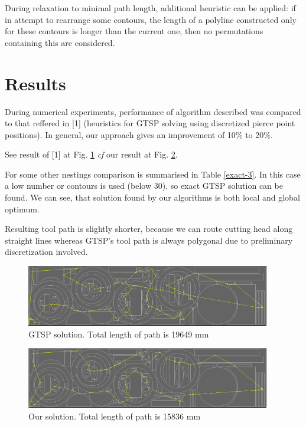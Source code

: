 \documentclass{../download/tPRS2e}
\begin{document}
During relaxation to minimal path length,
additional heuristic can be applied:
if in attempt to rearrange some contours,
the length of a polyline constructed
only for these contours is longer than the current one,
then no permutations containing this are considered.

\section{Results}

During numerical experiments,
performance of algorithm described
was compared to that reffered in [1]
(heuristics for GTSP solving
using discretized pierce point positions).
In general, our approach gives an improvement of 10\% to 20\%.

See result of [1] at Fig. \ref{dynprog}
\textit{cf} our result at Fig. \ref{heuristics}.

For some other nestings comparison is summarised in Table \ref{exact-3}.
In this case a low number or contours is used
(below 30),
so exact GTSP solution can be found.
We can see,
that solution found by our algorithms
is both local and global optimum.

Resulting tool path is slightly shorter,
because we can route cutting head along straight lines
whereas GTSP's tool path is always polygonal
due to preliminary discretization involved.

\begin{figure}[]
    \includegraphics[width=0.95\textwidth]{mini-bad.png}
    \caption{GTSP solution. Total length of path is 19649 mm}
    \label{dynprog}
\end{figure}

\begin{figure}[]
    \includegraphics[width=0.95\textwidth]{mini-good.png}
    \caption{Our solution. Total length of path is 15836 mm}
    \label{heuristics}
\end{figure}
\end{document}
